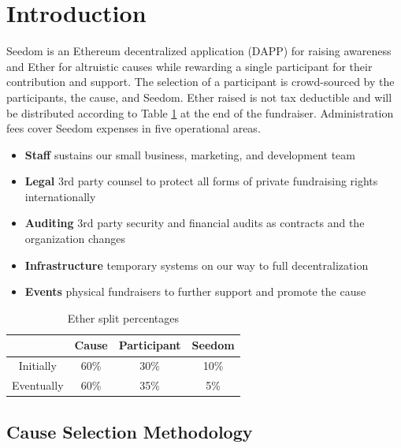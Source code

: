 \documentclass[11pt]{article}
\begin{document}
\tableofcontents
\pagebreak

\section{Introduction}

Seedom is an Ethereum decentralized application (DAPP) for raising awareness and Ether for altruistic causes while rewarding a single participant for their contribution and support. The selection of a participant is crowd-sourced by the participants, the cause, and Seedom. Ether raised is not tax deductible and will be distributed according to Table \ref{tab:etherSplitPercentages} at the end of the fundraiser. Administration fees cover Seedom expenses in five operational areas.

\begin{itemize}
\item{\textbf{Staff} sustains our small business, marketing, and development team}
\item{\textbf{Legal} 3rd party counsel to protect all forms of private fundraising rights internationally}
\item{\textbf{Auditing} 3rd party security and financial audits as contracts and the organization changes}
\item{\textbf{Infrastructure} temporary systems on our way to full decentralization}
\item{\textbf{Events} physical fundraisers to further support and promote the cause}
\end{itemize}

\begin{table}[H]
\begin{center}
\begin{tabular}{| c | c | c | c |}
\hline
& \textbf{Cause} & \textbf{Participant} & \textbf{Seedom} \\ \hline
Initially & 60\% & 30\% & 10\% \\ \hline
Eventually & 60\% & 35\% & 5\% \\ \hline
\end{tabular}
\caption{Ether split percentages}
\label{tab:etherSplitPercentages}
\end{center}
\end{table}

\subsection{Cause Selection Methodology}
\end{document}
